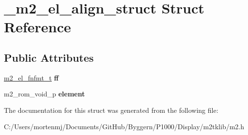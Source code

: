 \hypertarget{struct__m2__el__align__struct}{\section{\-\_\-m2\-\_\-el\-\_\-align\-\_\-struct Struct Reference}
\label{struct__m2__el__align__struct}
}
\subsection*{Public Attributes}
\begin{DoxyCompactItemize}
\item 
\hypertarget{struct__m2__el__align__struct_a3af053528d37829a5aea4efb0bbc8d15}{\hyperlink{struct__m2__el__fnfmt__struct}{m2\-\_\-el\-\_\-fnfmt\-\_\-t} {\bfseries ff}}\label{struct__m2__el__align__struct_a3af053528d37829a5aea4efb0bbc8d15}

\item 
\hypertarget{struct__m2__el__align__struct_a5fc5dee35270b0b7a80eb957bea0b1a8}{m2\-\_\-rom\-\_\-void\-\_\-p {\bfseries element}}\label{struct__m2__el__align__struct_a5fc5dee35270b0b7a80eb957bea0b1a8}

\end{DoxyCompactItemize}


The documentation for this struct was generated from the following file\-:\begin{DoxyCompactItemize}
\item 
C\-:/\-Users/mortenmj/\-Documents/\-Git\-Hub/\-Byggern/\-P1000/\-Display/m2tklib/m2.\-h\end{DoxyCompactItemize}
